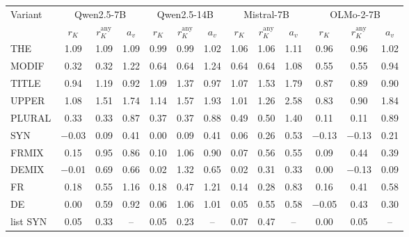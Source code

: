 \begin{tabular}{@{}lcccccccccccc@{}}
\toprule
Variant & \multicolumn{3}{c}{Qwen2.5-7B} & \multicolumn{3}{c}{Qwen2.5-14B} & \multicolumn{3}{c}{Mistral-7B} & \multicolumn{3}{c}{OLMo-2-7B} \\
\cmidrule(lr){2-4}\cmidrule(lr){5-7}\cmidrule(lr){8-10}\cmidrule(lr){11-13}
 & $r_K$ & $r_K^{\mathrm{any}}$ & $a_v$ & $r_K$ & $r_K^{\mathrm{any}}$ & $a_v$ & $r_K$ & $r_K^{\mathrm{any}}$ & $a_v$ & $r_K$ & $r_K^{\mathrm{any}}$ & $a_v$ \\
\midrule
THE & 1.09 & 1.09 & 1.09 & 0.99 & 0.99 & 1.02 & 1.06 & 1.06 & 1.11 & 0.96 & 0.96 & 1.02 \\
MODIF & 0.32 & 0.32 & 1.22 & 0.64 & 0.64 & 1.24 & 0.64 & 0.64 & 1.08 & 0.55 & 0.55 & 0.94 \\
TITLE & 0.94 & 1.19 & 0.92 & 1.09 & 1.37 & 0.97 & 1.07 & 1.53 & 1.79 & 0.87 & 0.89 & 0.90 \\
UPPER & 1.08 & 1.51 & 1.74 & 1.14 & 1.57 & 1.93 & 1.01 & 1.26 & 2.58 & 0.83 & 0.90 & 1.84 \\
PLURAL & 0.33 & 0.33 & 0.87 & 0.37 & 0.37 & 0.88 & 0.49 & 0.50 & 1.40 & 0.11 & 0.11 & 0.89 \\
SYN & $-$0.03 & 0.09 & 0.41 & 0.00 & 0.09 & 0.41 & 0.06 & 0.26 & 0.53 & $-$0.13 & $-$0.13 & 0.21 \\
FRMIX & 0.15 & 0.95 & 0.86 & 0.10 & 1.06 & 0.90 & 0.07 & 0.56 & 0.55 & 0.09 & 0.44 & 0.39 \\
DEMIX & $-$0.01 & 0.69 & 0.66 & 0.02 & 1.32 & 0.65 & 0.02 & 0.31 & 0.33 & 0.00 & $-$0.13 & 0.09 \\
FR & 0.18 & 0.55 & 1.16 & 0.18 & 0.47 & 1.21 & 0.14 & 0.28 & 0.83 & 0.16 & 0.41 & 0.58 \\
DE & 0.00 & 0.59 & 0.92 & 0.06 & 1.06 & 1.01 & 0.05 & 0.55 & 0.58 & $-$0.05 & 0.43 & 0.30 \\
list SYN & 0.05 & 0.33 & -- & 0.05 & 0.23 & -- & 0.07 & 0.47 & -- & 0.00 & 0.05 & -- \\
\bottomrule
\end{tabular}
